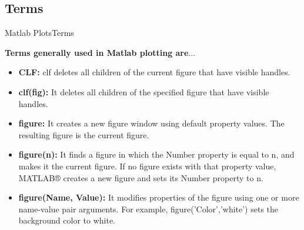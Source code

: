 \documentclass[10pt,xcolor={dvipsnames}]{beamer}
\begin{document}
\subsection{Terms}
\begin{frame}{Matlab Plots}{Terms}

\textbf {Terms generally used in Matlab plotting are}...\\
    \begin{itemize}
    
    \item {\textbf {CLF:}} clf deletes all children of the current figure that have visible handles.
    
    \item {\textbf {clf(fig):}} It deletes all children of the specified figure that have visible handles.
    
    \item {\textbf {figure:}} It creates a new figure window using default property values. The resulting figure is the current figure.
    
    \item {\textbf {figure(n):}} It  finds a figure in which the Number property is equal to n, and makes it the current figure. If no figure exists with that property value, MATLAB® creates a new figure and sets its Number property to n.
    
    \item {\textbf {figure(Name, Value):}} It modifies properties of the figure using one or more name-value pair arguments. For example, figure('Color','white') sets the background color to white.
    
    
  \end{itemize}
  \end{frame}
    
\end{document}
